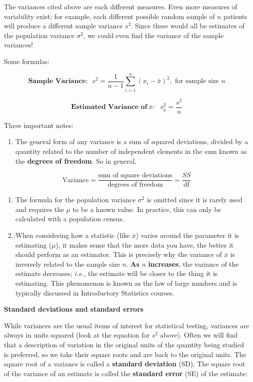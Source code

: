 \documentclass[
]{book}
\providecommand{\tightlist}{%
  \setlength{\itemsep}{0pt}\setlength{\parskip}{0pt}}
\begin{document}
The variances cited above are each different measures. Even more measures of variability exist; for example, each different possible random sample of \(n\) patients will produce a different sample variance \(s^2\). Since these would all be estimates of the population variance \(\sigma^2\), we could even find the variance of the sample variances!

Some formulas:

\[\textbf{Sample Variance:}~~~ s^2 = \frac{1}{n-1}\sum_{i=1}^n (x_i - \bar{x})^2, \textrm{ for sample size } n\]

\[\textbf{Estimated Variance of}~ \bar{x}:~~~ s^2_{\bar{x}} = \frac{s^2}{n}\]

Three important notes:

\begin{enumerate}
\def\labelenumi{\arabic{enumi}.}
\tightlist
\item
  The general form of any variance is a sum of squared deviations, divided by a quantity related to the number of independent elements in the sum known as the \textbf{degrees of freedom}. So in general,
\end{enumerate}

\[\textrm{Variance} = \frac{\textrm{sum of square deviations}}{\textrm{degrees of freedom}} = \frac{SS}{\textrm{df}}\]

\begin{enumerate}
\def\labelenumi{\arabic{enumi}.}
\setcounter{enumi}{1}
\item
  The formula for the population variance \(\sigma^2\) is omitted since it is rarely used and requires the \(\mu\) to be a known value. In practice, this can only be calculated with a population census.
\item
  When considering how a statistic (like \(\bar{x}\)) varies around the parameter it is estimating (\(\mu\)), it makes sense that the more data you have, the better it should perform as an estimator. This is precisely why the variance of \(\bar{x}\) is inversely related to the sample size \(n\). \textbf{As} \(n\) \textbf{increases}, the variance of the estimate decreases; \emph{i.e.}, the estimate will be closer to the thing it is estimating. This phenomenon is known as the law of large numbers and is typically discussed in Introductory Statistics courses.
\end{enumerate}

\textbf{Standard deviations and standard errors}

While variances are the usual items of interest for statistical testing, variances are always in units squared (look at the equation for \(s^2\) above).
Often we will find that a description of variation in the original units of the quantity being studied is preferred, so we take their square roots and are back to the original units. The square root of a variance is called a \textbf{standard deviation} (SD).
The square root of the variance of an estimate is called the \textbf{standard error} (SE) of the estimate:
\end{document}
